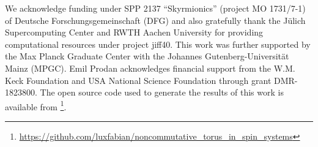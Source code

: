 \documentclass[
    10pt,
    aps,
    prl,
    twocolumn,
    floatfix,
    superscriptaddress
]{revtex4-2}
\begin{document}
\vfill \newpage


We  acknowledge  funding  under SPP 2137 ``Skyrmionics'' (project  MO  1731/7-1)  of  Deutsche  Forschungsgemeinschaft (DFG) and also gratefully thank the J\"ulich Supercomputing Center and RWTH Aachen University for providing computational resources under project jiff40. 
This work was further supported by the Max Planck Graduate Center with the Johannes Gutenberg-Universit\"at Mainz (MPGC).
Emil Prodan acknowledges financial support from the W.M. Keck Foundation and USA National Science Foundation through grant  DMR-1823800.
The open source code used to generate the results of this work is available from \footnote{\url{https://github.com/luxfabian/noncommutative_torus_in_spin_systems}}.



   
\end{document}
